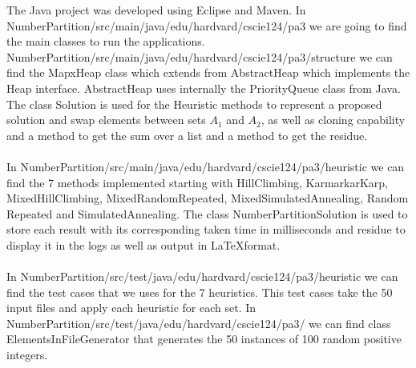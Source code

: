 \documentclass[tikz, 12pt]{scrartcl}
\begin{document}
The Java project was developed using Eclipse and Maven. In NumberPartition/src/main/java/edu/hardvard/cscie124/pa3 we are going to find the main classes to run the applications. NumberPartition/src/main/java/edu/hardvard/cscie124/pa3/structure we can find the MapxHeap class which extends from AbstractHeap which implements the Heap interface. AbstractHeap uses internally the PriorityQueue class from Java. The class Solution is used for the Heuristic methods to represent a proposed solution and swap elements between sets $A_1$ and $A_2$, as well as cloning capability and a method to get the sum over a list and a method to get the residue.\\
\\
In NumberPartition/src/main/java/edu/hardvard/cscie124/pa3/heuristic we can find the 7 methods implemented starting with HillClimbing, KarmarkarKarp, MixedHillClimbing, MixedRandomRepeated, MixedSimulatedAnnealing, Random Repeated and SimulatedAnnealing. The class NumberPartitionSolution is used to store each result with its corresponding taken time in milliseconds and residue to display it in the logs as well as output in \LaTeX format.\\
\\
In NumberPartition/src/test/java/edu/hardvard/cscie124/pa3/heuristic we can find the test cases that we uses for the 7 heuristics. This test cases take the 50 input files and apply each heuristic for each set. In NumberPartition/src/test/java/edu/hardvard/cscie124/pa3/ we can find class ElementsInFileGenerator that generates the 50 instances of 100 random positive integers.
\end{document}

